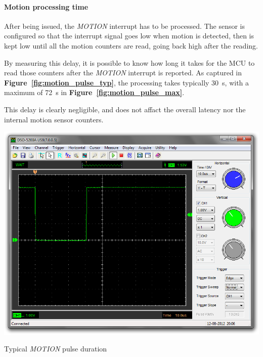 \documentclass[a4paper,10pt]{article}
\makeatletter
\newenvironment{figurehere}{\def\@captype{figure}\vspace{2ex}}{\vspace{2ex}}
\newcommand{\citef}[1]{\textbf{Figure~\ref{#1}}}
\makeatother
\begin{document}
\begin{multicols}{2}
\paragraph{Motion processing time}
After being issued, the \emph{MOTION} interrupt has to be processed. The
sensor is configured so that the interrupt signal goes low when motion is
detected, then is kept low until all the motion counters are read, going back
high after the reading.

By measuring this delay, it is possible to know how long it takes for the MCU
to read those counters after the \emph{MOTION} interrupt is reported. As
captured in \citef{fig:motion_pulse_typ}, the processing takes typically
30~{\textmu}s, with a maximum of 72~{\textmu}s in \citef{fig:motion_pulse_max}.

This delay is clearly negligible, and does not affact the overall latency nor
the internal motion sensor counters.

\begin{figurehere}
	\centering
	\includegraphics[keepaspectratio=true,width=\columnwidth]{images/motion_pulse_typ.png}
	\caption{Typical \emph{MOTION} pulse duration}
	\label{fig:motion_pulse_typ}
\end{figurehere}


\end{multicols}
\end{document}
